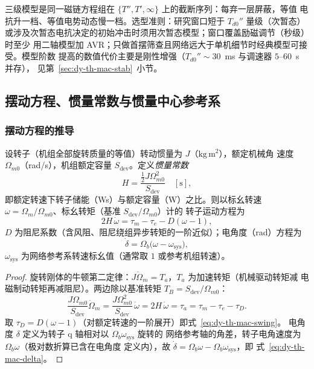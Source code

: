 \begin{remark}[谱系的统一视角]\label{rem:dy-th-mac-hierarchy}
三级模型是同一磁链方程组在 $\{T'',T',\infty\}$ 上的截断序列：每弃一层屏蔽，等值
电抗升一档、等值电势动态慢一档。选型准则：研究窗口短于 $T_{d0}''$ 量级（次暂态）
或涉及次暂态电抗决定的初始冲击时须用次暂态模型；窗口覆盖励磁调节（秒级）时至少
用二轴模型加 AVR；只做首摆筛查且网络远大于单机细节时经典模型可接受。模型阶数
提高的数值代价主要是刚性增强（$T_{d0}''\sim30$~ms 与调速器 $5$--$60$~s 并存），
见第~\ref{sec:dy-th-mac-stab}~小节。
\end{remark}

\subsection{摆动方程、惯量常数与惯量中心参考系}\label{sec:dy-th-mac-swing}

\subsubsection{摆动方程的推导}

\begin{proposition}[摆动方程与惯量常数]\label{prop:dy-th-mac-swing}
设转子（机组全部旋转质量的等值）转动惯量为 $J$（$\mathrm{kg\,m^2}$），额定机械角
速度 $\Omega_{m0}$（rad/s），机组额定容量 $S_{\mathrm{dev}}$。定义\emph{惯量常数}
\begin{equation}
H=\frac{\tfrac12 J\Omega_{m0}^2}{S_{\mathrm{dev}}}\quad[\mathrm s],
\label{eq:dy-th-mac-H}
\end{equation}
即额定转速下转子储能（Ws）与额定容量（W）之比。则以标幺转速
$\omega=\Omega_m/\Omega_{m0}$、标幺转矩（基准 $S_{\mathrm{dev}}/\Omega_{m0}$）计的
转子运动方程为
\begin{equation}
2H\,\dot\omega=\tau_m-\tau_e-D(\omega-1),
\label{eq:dy-th-mac-swing}
\end{equation}
$D$ 为阻尼系数（含风阻、阻尼绕组异步转矩的一阶近似）；电角度（rad）方程为
\begin{equation}
\dot\delta=\Omega_b\bigl(\omega-\omega_{\mathrm{sys}}\bigr),
\label{eq:dy-th-mac-delta}
\end{equation}
$\omega_{\mathrm{sys}}$ 为网络参考系转速标幺值（通常取 $1$ 或参考机组转速）。
\end{proposition}

\begin{proof}
旋转刚体的牛顿第二定律：$J\dot\Omega_m=T_a$，$T_a$ 为加速转矩（机械驱动转矩减
电磁制动转矩再减阻尼）。两边除以基准转矩 $T_B=S_{\mathrm{dev}}/\Omega_{m0}$：
\begin{equation}
\frac{J\Omega_{m0}}{S_{\mathrm{dev}}}\dot\Omega_m
=\frac{J\Omega_{m0}^2}{S_{\mathrm{dev}}}\,\dot\omega
=2H\,\dot\omega=\tau_a=\tau_m-\tau_e-\tau_D .
\end{equation}
取 $\tau_D=D(\omega-1)$（对额定转速的一阶展开）即式~\eqref{eq:dy-th-mac-swing}。
电角度 $\delta$ 定义为转子 q 轴相对以 $\Omega_b\omega_{\mathrm{sys}}$ 旋转的
网络参考轴的角差，转子电角速度为 $\Omega_b\omega$（极对数折算已含在电角度
定义内），故 $\dot\delta=\Omega_b\omega-\Omega_b\omega_{\mathrm{sys}}$，即
式~\eqref{eq:dy-th-mac-delta}。
\end{proof}

